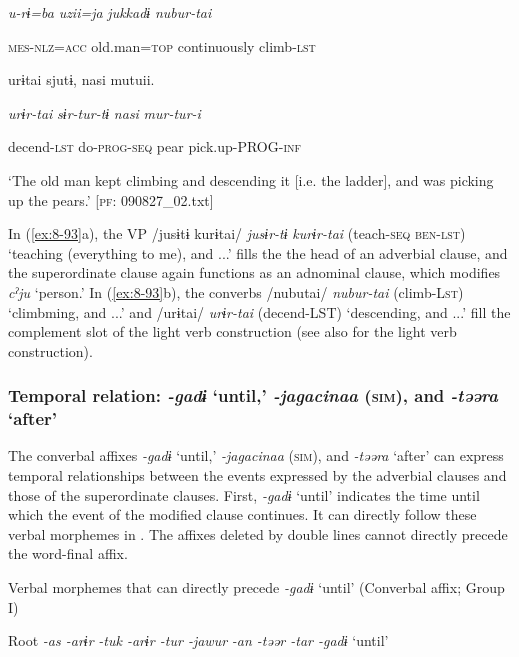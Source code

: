       \textit{u-rɨ=ba}    \textit{uzii=ja}  \textit{jukkadɨ}  \textit{nubur-tai}

      \textsc{mes}-\textsc{nlz}=\textsc{acc}    old.man=\textsc{top}  continuously  climb-\textsc{lst}

      urɨtai  sjutɨ,  nasi  mutuii.

      \textit{urɨr-tai}  \textit{sɨr-tur-tɨ}  \textit{nasi}  \textit{mur-tur-i}

      decend-\textsc{lst}  do-\textsc{prog}-\textsc{seq}  pear  pick.up-PROG-\textsc{inf}

\glt ‘The old man kept climbing and descending it [i.e. the ladder], and was picking up the pears.’ [\textsc{pf}: 090827\_02.txt]
\z

In (\ref{ex:8-93}a), the VP /jusɨtɨ kurɨtai/ \textit{jusɨr-tɨ} \textit{kurɨr-tai} (teach-\textsc{seq} \textsc{ben}-\textsc{lst}) ‘teaching (everything to me), and ...’ fills the the head of an adverbial clause, and the superordinate clause again functions as an adnominal clause, which modifies \textit{cˀju} ‘person.’ In (\ref{ex:8-93}b), the converbs /nubutai/ \textit{nubur-tai} (climb-L\textsc{st}) ‘climbming, and ...’ and /urɨtai/ \textit{urɨr-tai} (decend-LST) ‘descending, and ...’ fill the complement slot of the light verb construction (see also  for the light verb construction).

\subsubsection{Temporal relation: \textit{{}-gadɨ} ‘until,’ \textit{{}-jagacinaa} (\textsc{sim}), and \textit{{}-təəra} ‘after’}

The converbal affixes \textit{{}-gadɨ} ‘until,’ \textit{{}-jagacinaa} (\textsc{sim}), and \textit{{}-təəra} ‘after’ can express temporal relationships between the events expressed by the adverbial clauses and those of the superordinate clauses. First, \textit{{}-gadɨ} ‘until’ indicates the time until which the event of the modified clause continues. It can directly follow these verbal morphemes in . The affixes deleted by double lines cannot directly precede the word-final affix.

\ea\label{ex:8-94}
  Verbal morphemes that can directly precede \textit{{}-gadɨ} ‘until’ (Converbal affix; Group I)

  Root  \textit{{}-as  {}-arɨr} %
\textit{{}-tuk  {}-arɨr  {}-tur  {}-jawur} %
\textit{{}-an  {}-təər  {}-tar  {}-gadɨ} ‘until’

